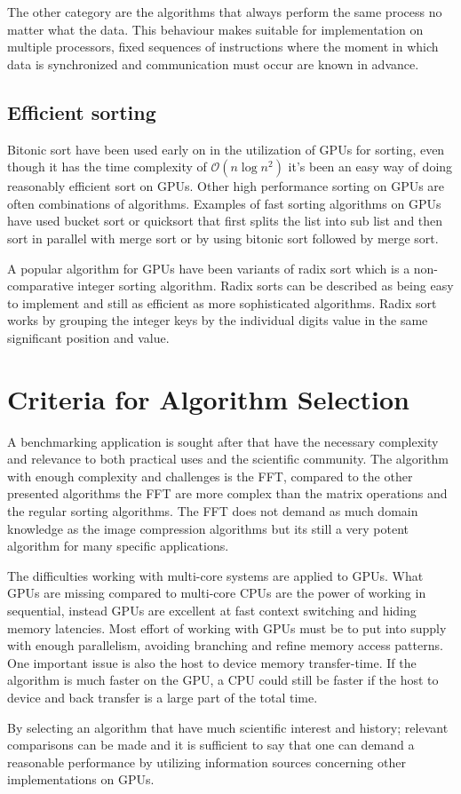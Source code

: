 The other category are the algorithms that always perform the same process no matter what the data. This behaviour makes suitable for implementation on multiple processors, fixed sequences of instructions where the moment in which data is synchronized and communication must occur are known in advance.

\subsection{Efficient sorting}
Bitonic sort have been used early on in the utilization of \gls{GPU}s for sorting, even though it has the time complexity of $\mathcal{O}(n\log{n^2})$ it's been an easy way of doing reasonably efficient sort on \gls{GPU}s. Other high performance sorting on \gls{GPU}s are often combinations of algorithms. Examples of fast sorting algorithms on GPUs have used bucket sort or quicksort that first splits the list into sub list and then sort in parallel with merge sort or by using bitonic sort followed by merge sort.

A popular algorithm for GPUs have been variants of radix sort which is a non-comparative integer sorting algorithm. Radix sorts can be described as being easy to implement and still as efficient as more sophisticated algorithms. Radix sort works by grouping the integer keys by the individual digits value in the same significant position and value.

\section{Criteria for Algorithm Selection}
A benchmarking application is sought after that have the necessary complexity and relevance to both practical uses and the scientific community. The algorithm with enough complexity and challenges is the \gls{FFT}, compared to the other presented algorithms the \gls{FFT} are more complex than the matrix operations and the regular sorting algorithms. The \gls{FFT} does not demand as much domain knowledge as the image compression algorithms but its still a very potent algorithm for many specific applications.

The difficulties working with multi-core systems are applied to \gls{GPU}s. What \gls{GPU}s are missing compared to multi-core \gls{CPU}s are the power of working in sequential, instead \gls{GPU}s are excellent at fast context switching and hiding memory latencies. Most effort of working with \gls{GPU}s must be to put into supply with enough parallelism, avoiding branching and refine memory access patterns. One important issue is also the host to device memory transfer-time. If the algorithm is much faster on the \gls{GPU}, a \gls{CPU} could still be faster if the host to device and back transfer is a large part of the total time.

By selecting an algorithm that have much scientific interest and history; relevant comparisons can be made and it is sufficient to say that one can demand a reasonable performance by utilizing information sources concerning other implementations on \gls{GPU}s.